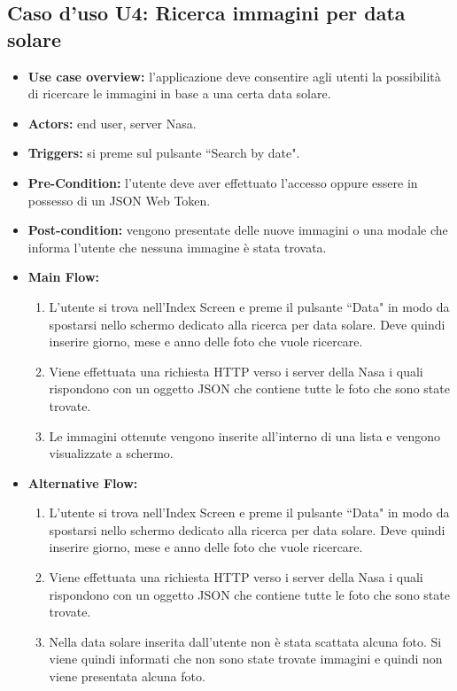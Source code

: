 \subsection*{Caso d'uso U4: Ricerca immagini per data solare}
\begin{itemize}
    \item  \textbf{Use case overview:} l'applicazione deve consentire agli utenti la possibilit\`a di ricercare le immagini in base a una certa data solare.
    \item \textbf{Actors:} end user, server Nasa.
    \item \textbf{Triggers:} si preme sul pulsante ``Search by date".
    \item \textbf{Pre-Condition:} l'utente deve aver effettuato l'accesso oppure essere in possesso di un JSON Web Token.
    \item \textbf{Post-condition:} vengono presentate delle nuove immagini o una modale che informa l'utente che nessuna immagine \`e stata trovata.
    \item \textbf{Main Flow:} \begin{enumerate}
              \item L'utente si trova nell'Index Screen e preme il pulsante ``Data" in modo da spostarsi nello schermo dedicato alla ricerca per data solare. Deve quindi inserire giorno, mese e anno delle foto che vuole ricercare.
              \item Viene effettuata una richiesta HTTP verso i server della Nasa i quali rispondono con un oggetto JSON che contiene tutte le foto che sono state trovate.
              \item Le immagini ottenute vengono inserite all'interno di una lista e vengono visualizzate a schermo.

          \end{enumerate}
    \item \textbf{Alternative Flow:}\begin{enumerate}
              \item L'utente si trova nell'Index Screen e preme il pulsante ``Data" in modo da spostarsi nello schermo dedicato alla ricerca per data solare. Deve quindi inserire giorno, mese e anno delle foto che vuole ricercare.
              \item Viene effettuata una richiesta HTTP verso i server della Nasa i quali rispondono con un oggetto JSON che contiene tutte le foto che sono state trovate.
              \item Nella data solare inserita dall'utente non \`e stata scattata alcuna foto. Si viene quindi informati che non sono state trovate immagini e quindi non viene presentata alcuna foto.

          \end{enumerate}
\end{itemize}

